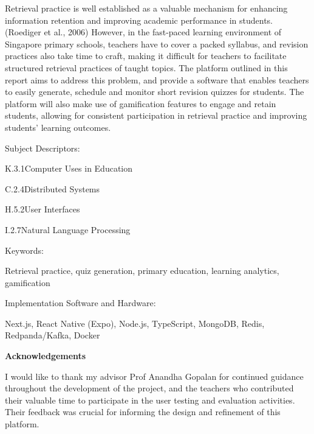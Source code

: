 \documentclass[
  12pt,
  a4paper,
]{report}
\begin{document}
Retrieval practice is well established as a valuable mechanism for
enhancing information retention and improving academic performance in
students. (Roediger et al., 2006) However, in the fast-paced learning
environment of Singapore primary schools, teachers have to cover a
packed syllabus, and revision practices also take time to craft, making
it difficult for teachers to facilitate structured retrieval practices
of taught topics. The platform outlined in this report aims to address
this problem, and provide a software that enables teachers to easily
generate, schedule and monitor short revision quizzes for students. The
platform will also make use of gamification features to engage and
retain students, allowing for consistent participation in retrieval
practice and improving students' learning outcomes.

\noindent Subject Descriptors:\par
{\setlength{\parskip}{0pt}
\begin{list}{}{
  \setlength{\leftmargin}{1.0cm}
  \setlength{\itemsep}{0pt}
  \setlength{\topsep}{0pt}
  \setlength{\parsep}{0pt}
  \setlength{\partopsep}{0pt}
}
  \item K.3.1\quad Computer Uses in Education
  \item C.2.4\quad Distributed Systems
  \item H.5.2\quad User Interfaces
  \item I.2.7\quad Natural Language Processing
\end{list}
}

\noindent Keywords:\par
\hspace*{1cm}\parbox{\dimexpr\linewidth-0.5cm\relax}{Retrieval practice, quiz generation, primary education, learning analytics, gamification}\par

\noindent Implementation Software and Hardware:\par
\hspace*{1cm}\parbox{\dimexpr\linewidth-0.5cm\relax}{Next.js, React Native (Expo), Node.js, TypeScript, MongoDB, Redis, Redpanda/Kafka, Docker}\par

\clearpage
{}
{}
\begin{center}
{\bfseries Acknowledgements}
\end{center}

\begingroup
{}
I would like to thank my advisor Prof Anandha Gopalan for continued guidance
throughout the development of the project, and the teachers who contributed their
valuable time to participate in the user testing and evaluation activities. Their
feedback was crucial for informing the design and refinement of this platform.
\endgroup
\end{document}
